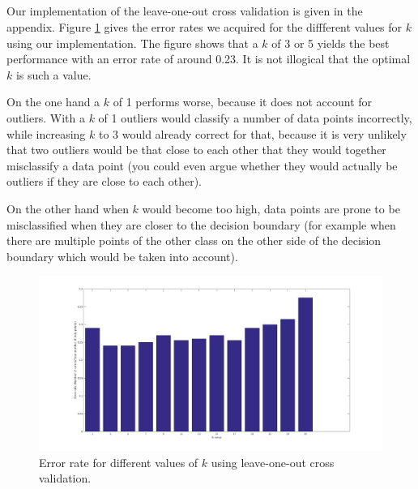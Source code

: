 \documentclass[10pt]{article}
\begin{document}
\subsection{}
Our implementation of the leave-one-out cross validation is given in the appendix. Figure \ref{fig2.3} gives the error rates we acquired for the diffferent values for $k$ using our implementation. The figure shows that a $k$ of 3 or 5 yields the best performance with an error rate of around 0.23. It is not illogical that the optimal $k$ is such a value. 

On the one hand a $k$ of 1 performs worse, because it does not account for outliers. With a $k$ of 1 outliers would classify a number of data points incorrectly, while increasing $k$ to 3 would already correct for that, because it is very unlikely that two outliers would be that close to each other that they would together misclassify a data point (you could even argue whether they would actually be outliers if they are close to each other). 

On the other hand when $k$ would become too high, data points are prone to be misclassified when they are closer to the decision boundary (for example when there are multiple points of the other class on the other side of the decision boundary which would be taken into account).

\begin{figure}[H]
 \centering
 \includegraphics[width=\textwidth]{assign2_3.png}
 \caption{Error rate for different values of $k$ using leave-one-out cross validation.}
 \label{fig2.3}
\end{figure}
\end{document}
